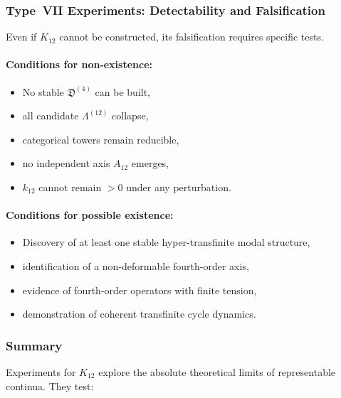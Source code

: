 \subsubsection{Type~VII Experiments: Detectability and Falsification}

Even if $K_{12}$ cannot be constructed, its falsification requires 
specific tests.

\paragraph{Conditions for non-existence:}

\begin{itemize}
    \item No stable $\mathfrak{D}^{(4)}$ can be built,
    \item all candidate $\Lambda^{(12)}$ collapse,
    \item categorical towers remain reducible,
    \item no independent axis $A_{12}$ emerges,
    \item $k_{12}$ cannot remain $> 0$ under any perturbation.
\end{itemize}

\paragraph{Conditions for possible existence:}

\begin{itemize}
    \item Discovery of at least one stable hyper-transfinite modal 
          structure,
    \item identification of a non-deformable fourth-order axis,
    \item evidence of fourth-order operators with finite tension,
    \item demonstration of coherent transfinite cycle dynamics.
\end{itemize}



\subsubsection{Summary}

Experiments for $K_{12}$ explore the absolute theoretical limits of 
representable continua.  
They test:

